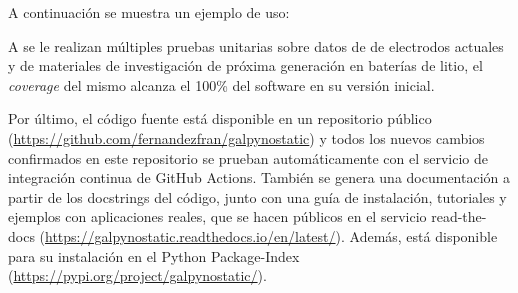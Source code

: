 A continuación se muestra un ejemplo de uso:



A  se le realizan múltiples pruebas unitarias sobre datos de
de electrodos actuales y de materiales de investigación de próxima generación en 
baterías de litio, el \textit{coverage} del mismo alcanza el 100\% del software
en su versión inicial.

Por último, el código fuente está disponible en un repositorio público 
(\url{https://github.com/fernandezfran/galpynostatic}) y todos los nuevos cambios 
confirmados en este repositorio se prueban automáticamente con el servicio de 
integración continua de GitHub Actions. También se genera una documentación a 
partir de los docstrings del código, junto con una guía de instalación,
tutoriales y ejemplos con aplicaciones reales, que se hacen públicos en el 
servicio read-the-docs (\url{https://galpynostatic.readthedocs.io/en/latest/}). 
Además,  está disponible para su instalación en el Python 
Package-Index (\url{https://pypi.org/project/galpynostatic/}).

